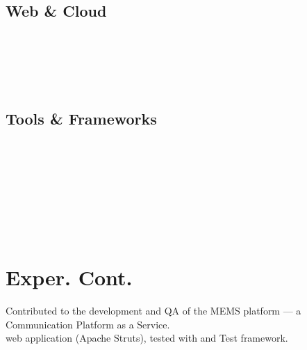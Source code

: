 \documentclass[a4paper]{resume}
\begin{document}
\begin{minipage}[t]{0.33\textwidth}
	\subsection{Web \& Cloud}
	\smallsectionspace{}
	\xml{} \textbullet{} \json{} \\
	\css{} \textbullet{} \react{} \\
	\aws{} \boto{} \textbullet{} \ectwo{} \textbullet{} \rds{} \\
	\jnciaJunos{} \textbullet{} \jnciaDevOps{} \\
	\sectionspace{}

	\subsection{Tools \& Frameworks}
	\smallsectionspace{}
	\linux{} \textbullet{} \git{} \textbullet{} \docker{} \\
	\cmake{} \textbullet{} \conan{} \textbullet{} \gdb{} \\
	\pytest{} \textbullet{} \asyncio{} \\
	\nodejs{} \textbullet{} \spring{} \\
	\googletest{} \textbullet{} \junit{} \\
	\cucumber{} \\
	\ansible{} \textbullet{} \jenkins{} \\

	\section{Exper. Cont.}
	\smallsectionspace{}

	\vspace{\topsep}
	\textbullet{}
	Contributed to the development and QA of the MEMS platform --- a Communication Platform as a Service. \\
	\textbullet{}
	\java{} web application (Apache Struts), tested with \junit{} and \cucumber{} Test framework. \\
	\smallsectionspace{}

\end{minipage} %
\hfill
%
\end{document}

